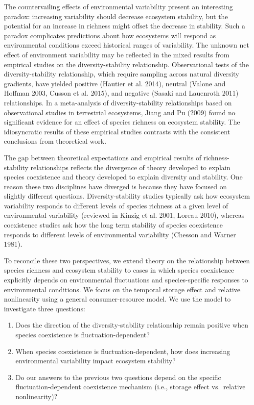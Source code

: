 \documentclass[12pt,]{article}
\begin{document}
The countervailing effects of environmental variability present an
interesting paradox: increasing variability should decrease ecosystem
stability, but the potential for an increase in richness might offset
the decrease in stability. Such a paradox complicates predictions about
how ecosystems will respond as environmental conditions exceed
historical ranges of variability. The unknown net effect of environment
variability may be reflected in the mixed results from empirical studies
on the diversity-stability relationship. Observational tests of the
diversity-stability relationship, which require sampling across natural
diversity gradients, have yielded positive (Hautier et al. 2014),
neutral (Valone and Hoffman 2003, Cusson et al. 2015), and negative
(Sasaki and Lauenroth 2011) relationships. In a meta-analysis of
diversity-stability relationships based on observational studies in
terrestrial ecosystems, Jiang and Pu (2009) found no significant
evidence for an effect of species richness on ecosystem stability. The
idiosyncratic results of these empirical studies contrasts with the
consistent conclusions from theoretical work.

The gap between theoretical expectations and empirical results of
richness-stability relationships reflects the divergence of theory
developed to explain species coexistence and theory developed to explain
diversity and stability. One reason these two disciplines have diverged
is because they have focused on slightly different questions.
Diversity-stability studies typically ask how ecosystem variability
responds to different levels of species richness at a given level of
environmental variability (reviewed in Kinzig et al. 2001, Loreau 2010),
whereas coexistence studies ask how the long term stability of species
coexistence responds to different levels of environmental variability
(Chesson and Warner 1981).

To reconcile these two perspectives, we extend theory on the
relationship between species richness and ecosystem stability to cases
in which species coexistence explicitly depends on environmental
fluctuations and species-specific responses to environmental conditions.
We focus on the temporal storage effect and relative nonlinearity using
a general consumer-resource model. We use the model to investigate three
questions:

\begin{enumerate}
\def\labelenumi{\arabic{enumi}.}
\item
  Does the direction of the diversity-stability relationship remain
  positive when species coexistence is fluctuation-dependent?
\item
  When species coexistence is fluctuation-dependent, how does increasing
  environmental variability impact ecosystem stability?
\item
  Do our answers to the previous two questions depend on the specific
  fluctuation-dependent coexistence mechanism (i.e., storage effect
  vs.~relative nonlinearity)?
\end{enumerate}
\end{document}

